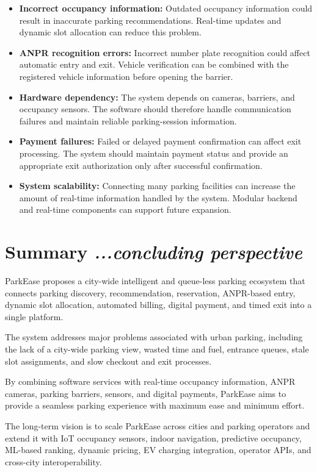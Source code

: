 \documentclass[12pt,a4paper]{article}
\begin{document}
\begin{itemize}
    \item \textbf{Incorrect occupancy information:} Outdated occupancy information could result in inaccurate parking recommendations. Real-time updates and dynamic slot allocation can reduce this problem.

    \item \textbf{ANPR recognition errors:} Incorrect number plate recognition could affect automatic entry and exit. Vehicle verification can be combined with the registered vehicle information before opening the barrier.

    \item \textbf{Hardware dependency:} The system depends on cameras, barriers, and occupancy sensors. The software should therefore handle communication failures and maintain reliable parking-session information.

    \item \textbf{Payment failures:} Failed or delayed payment confirmation can affect exit processing. The system should maintain payment status and provide an appropriate exit authorization only after successful confirmation.

    \item \textbf{System scalability:} Connecting many parking facilities can increase the amount of real-time information handled by the system. Modular backend and real-time components can support future expansion.
\end{itemize}


\section{\textbf{Summary}
\hfill
{\small\mdseries\itshape ...concluding perspective}}

ParkEase proposes a city-wide intelligent and queue-less parking ecosystem that connects parking discovery, recommendation, reservation, ANPR-based entry, dynamic slot allocation, automated billing, digital payment, and timed exit into a single platform.

The system addresses major problems associated with urban parking, including the lack of a city-wide parking view, wasted time and fuel, entrance queues, stale slot assignments, and slow checkout and exit processes.

By combining software services with real-time occupancy information, ANPR cameras, parking barriers, sensors, and digital payments, ParkEase aims to provide a seamless parking experience with maximum ease and minimum effort.

The long-term vision is to scale ParkEase across cities and parking operators and extend it with IoT occupancy sensors, indoor navigation, predictive occupancy, ML-based ranking, dynamic pricing, EV charging integration, operator APIs, and cross-city interoperability.
\end{document}
